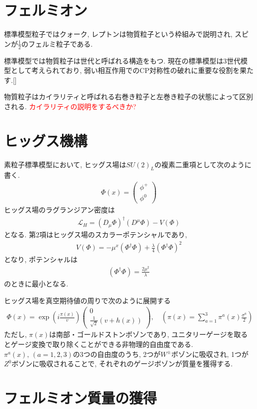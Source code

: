 \section{フェルミオン}
標準模型粒子ではクォーク, レプトンは物質粒子という枠組みで説明され, スピンが$\frac{1}{2}$のフェルミ粒子である.

標準模型では物質粒子は世代と呼ばれる構造をもつ.
現在の標準模型は3世代模型として考えられており, 弱い相互作用でのCP対称性の破れに重要な役割を果たす.[]

物質粒子はカイラリティと呼ばれる右巻き粒子と左巻き粒子の状態によって区別される.
\textcolor{red}{カイラリティの説明をするべきか?}
\section{ヒッグス機構}
素粒子標準模型において, ヒッグス場は$SU(2)_L$の複素二重項として次のように書く.
\begin{align}
  \Phi(x) = \left(
  \begin{array}{c}
    \phi^+ \\
    \phi^0
  \end{array}
  \right)
\end{align}
ヒッグス場のラグランジアン密度は
\begin{align}
  \mathcal{L}_H = \left(D_\mu \Phi\right)^\dagger (D^\mu \Phi) -V(\Phi) \label{L_H}
\end{align}
となる.
第2項はヒッグス場のスカラーポテンシャルであり,
\begin{align}
  V(\Phi) = -\mu^x (\Phi^\dagger\Phi)+ \frac{\lambda}{4}(\Phi^\dagger \Phi)^2\label{V_H}
\end{align}
となり, ポテンシャルは
\begin{align}
  (\Phi^\dagger \Phi) = \frac{2\mu^2}{\lambda}\nonumber
\end{align}
のときに最小となる.

ヒッグス場を真空期待値の周りで次のように展開する
\begin{align}
  \Phi(x) = \exp\left(i\frac{\pi(x)}{v}\right)\left(
  \begin{array}{c}
    0 \\
    \frac{1}{\sqrt{2}}\left(v + h(x)\right)
  \end{array}
\right),\quad \left(\pi(x) = \sum_{a=1}^3\pi^a(x)\frac{\sigma^a}{2}\right)\label{higgs}
\end{align}
ただし, $\pi(x)$は南部・ゴールドストンボゾンであり, ユニタリーゲージを取るとゲージ変換で取り除くことができる非物理的自由度である.
$\pi^a(x),\,(a=1,2,3)$の3つの自由度のうち,  2つが$W^\pm$ボゾンに吸収され, 1つが$Z^0$ボゾンに吸収されることで, それぞれのゲージボゾンが質量を獲得する.


\section{フェルミオン質量の獲得}



